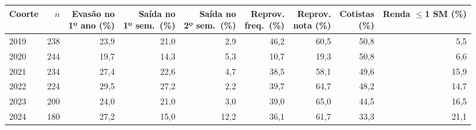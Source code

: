 \begin{tabular}{lrrrrrrrr}
\toprule
Coorte & $n$ & \makecell[r]{Evasão no\\1º ano (\%)} & \makecell[r]{Saída no\\1º sem.\ (\%)} & \makecell[r]{Saída no\\2º sem.\ (\%)} & \makecell[r]{Reprov.\\freq.\ (\%)} & \makecell[r]{Reprov.\\nota (\%)} & \makecell[r]{Cotistas\\(\%)} & \makecell[r]{Renda\\$\leq$1 SM (\%)} \\
\midrule
2019 & 238 & 23,9 & 21,0 & 2,9 & 46,2 & 60,5 & 50,8 & 5,5 \\
2020 & 244 & 19,7 & 14,3 & 5,3 & 10,7 & 19,3 & 50,8 & 6,6 \\
2021 & 234 & 27,4 & 22,6 & 4,7 & 38,5 & 58,1 & 49,6 & 15,9 \\
2022 & 224 & 29,5 & 27,2 & 2,2 & 39,7 & 64,7 & 48,2 & 14,7 \\
2023 & 200 & 24,0 & 21,0 & 3,0 & 39,0 & 65,0 & 44,5 & 16,5 \\
2024 & 180 & 27,2 & 15,0 & 12,2 & 36,1 & 61,7 & 33,3 & 21,1 \\
\bottomrule
\end{tabular}
